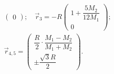 {\begin{equation}
\begin{gathered}
\begin{pmatrix}
		0
	\end{pmatrix}; \quad 
	\vec{r}_3 = - R \begin{pmatrix}
		1 + \dfrac{ 5 M_2}{12 M_1}\\[1pc]
		0
	\end{pmatrix};\\[0.5pc]
	\vec{r}_{4,5} = \begin{pmatrix}
		\dfrac{R}{2} \cdot \dfrac{M_1-M_2}{M_1+M_2}\\[1pc]
		\pm \dfrac{\sqrt{3}R}{2}
	\end{pmatrix}.
	\end{gathered}
\end{equation}
 }

